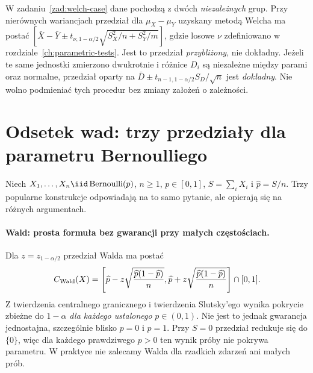 \begin{przyklad}
W zadaniu~\ref{zad:welch-case} dane pochodzą z dwóch
\emph{niezależnych} grup. Przy nierównych wariancjach
przedział dla $\mu_X-\mu_Y$ uzyskany metodą Welcha ma
postać
$[\bar X-\bar Y\pm t_{\nu,1-\alpha/2}
\sqrt{S_X^2/n+S_Y^2/m}]$, gdzie losowe $\nu$
zdefiniowano w rozdziale~\ref{ch:parametric-tests}.
Jest to przedział \emph{przybliżony}, nie dokładny.
Jeżeli te same jednostki zmierzono dwukrotnie i różnice
$D_i$ są niezależne między parami oraz normalne,
przedział oparty na $\bar D\pm t_{n-1,1-\alpha/2}S_D/\sqrt n$
jest \emph{dokładny}. Nie wolno podmieniać tych procedur
bez zmiany założeń o zależności.
\end{przyklad}

\section{Odsetek wad: trzy przedziały dla parametru Bernoulliego}
Niech $X_1,\ldots,X_n\iid\operatorname{Bernoulli}(p)$,
$n\ge1$, $p\in[0,1]$, $S=\sum_iX_i$ i
$\widehat p=S/n$. Trzy popularne konstrukcje odpowiadają
na to samo pytanie, ale opierają się na różnych argumentach.

\paragraph{Wald: prosta formuła bez gwarancji przy małych częstościach.}
Dla $z=z_{1-\alpha/2}$ przedział Walda ma postać
\[
 C_{\rm Wald}(X)=\left[\widehat p-z\sqrt{\frac{\widehat p(1-\widehat p)}n},
\widehat p+z\sqrt{\frac{\widehat p(1-\widehat p)}n}\right]
\cap[0,1].
\]
Z twierdzenia centralnego granicznego i twierdzenia Slutsky'ego
wynika pokrycie zbieżne do $1-\alpha$ \emph{dla każdego
ustalonego} $p\in(0,1)$. Nie jest to jednak gwarancja
jednostajna, szczególnie blisko $p=0$ i $p=1$.
Przy $S=0$ przedział redukuje się do $\{0\}$, więc dla
każdego prawdziwego $p>0$ ten wynik próby nie pokrywa
parametru. W praktyce nie zalecamy Walda dla rzadkich
zdarzeń ani małych prób.

